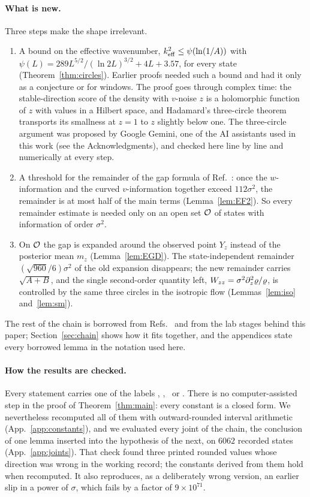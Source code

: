 \paragraph*{What is new.}
Three steps make the shape irrelevant.
\begin{enumerate}
\item A bound on the effective wavenumber, $k_{\mathrm{eff}}^2\le\psi(\ln(1/A))$ with $\psi(L)=289L^{5/2}/(\ln2L)^{3/2}+4L+3.57$, for every state (Theorem~\ref{thm:circles}).
Earlier proofs needed such a bound and had it only as a conjecture or for windows.
The proof goes through complex time: the stable-direction score of the density with $v$-noise $z$ is a holomorphic function of $z$ with values in a Hilbert space, and Hadamard's three-circle theorem transports its smallness at $z=1$ to $z$ slightly below one.
The three-circle argument was proposed by Google Gemini, one of the AI assistants used in this work (see the Acknowledgments), and checked here line by line and numerically at every step.
\item A threshold for the remainder of the gap formula of Ref.~\cite{E}: once the $w$-information and the curved $v$-information together exceed $112\sigma^2$, the remainder is at most half of the main terms (Lemma~\ref{lem:EF2}).
So every remainder estimate is needed only on an open set $\mathcal O$ of states with information of order $\sigma^2$.
\item On $\mathcal O$ the gap is expanded around the observed point $Y_z$ instead of the posterior mean $m_z$ (Lemma~\ref{lem:EGD}).
The state-independent remainder $(\sqrt{960}/6)\sigma^2$ of the old expansion disappears; the new remainder carries $\sqrt{A+B}$, and the single second-order quantity left, $W_{zz}=\sigma^2\partial_z^2\varrho/\varrho$, is controlled by the same three circles in the isotropic flow (Lemmas~\ref{lem:iso} and~\ref{lem:sm}).
\end{enumerate}
The rest of the chain is borrowed from Refs.~\cite{E,F} and from the lab stages behind this paper; Section~\ref{sec:chain} shows how it fits together, and the appendices state every borrowed lemma in the notation used here.

\paragraph*{How the results are checked.}
Every statement carries one of the labels \proofst, \derivst, \numst\ or \conjst.
There is no computer-assisted step in the proof of Theorem~\ref{thm:main}: every constant is a closed form.
We nevertheless recomputed all of them with outward-rounded interval arithmetic (App.~\ref{app:constants}), and we evaluated every joint of the chain, the conclusion of one lemma inserted into the hypothesis of the next, on $6062$ recorded states (App.~\ref{app:joints}).
That check found three printed rounded values whose direction was wrong in the working record; the constants derived from them hold when recomputed.
It also reproduces, as a deliberately wrong version, an earlier slip in a power of $\sigma$, which fails by a factor of $9\times10^{71}$.

